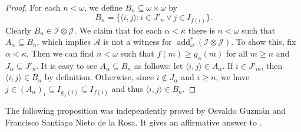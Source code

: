 \documentclass[a4paper,12pt]{amsart}
\theoremstyle{definition}
\numberwithin{thm}{section}
\numberwithin{equation}{section}
\DeclareMathOperator{\add}{add}
\newcommand{\I}{\mathscr{I}}
\newcommand{\J}{\mathscr{J}}
\renewcommand{\subset}{\subseteq}
\begin{document}
\begin{proof}
        For each $n<\omega$, we define $B_n\subset\omega\times\omega$ by
        \[
        B_n = \{\langle i, j\rangle: i\in J'_n \lor j\in I_{f(i)}\}.
        \]
        Clearly $B_n \in \I \otimes \J$. We claim that for each $\alpha < \kappa$ there is $n<\omega$ such that $A_\alpha \subseteq B_n$, which implies $\mathcal{A}$ is not a witness for $\add^*_\omega(\I\otimes\J)$. To show this, fix $\alpha < \kappa$. Then we can find $n<\omega$ such that $f(m)\geq g_\alpha(m)$ for all $m\geq n$ and $J_\alpha\subset J'_n$. It is easy to see $A_\alpha\subset B_n$ as follows: let $\langle i, j\rangle\in A_\alpha$. If $i \in J'_m$, then $\langle i, j\rangle\in B_n$ by definition. Otherwise, since $i \notin J_\alpha$ and $i\geq n$, we have $j\in (A_\alpha)_i \subset I_{g_\alpha (i)} \subset I_{f(i)}$ and thus $\langle i, j\rangle\in B_n$.
	\end{proof}

    The following proposition was independently proved by Osvaldo Guzm\'an and Francisco Santiago Nieto de la Rosa. It gives an affirmative answer to \cite[Question 4.10]{CM25}.
\end{document}
